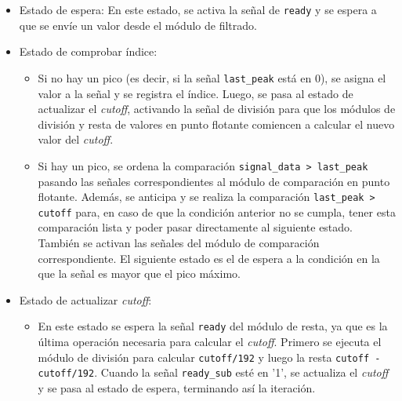 \begin{itemize}
    \item Estado de espera: En este estado, se activa la señal de \texttt{ready} y se espera a que se envíe un valor desde el módulo de filtrado.
    \item Estado de comprobar índice:
    \begin{itemize}
        \item Si no hay un pico (es decir, si la señal \texttt{last\_peak} está en 0), se asigna el valor a la señal y se registra el índice. Luego, se pasa al estado de actualizar el \textit{cutoff}, activando la señal de división para que los módulos de división y resta de valores en punto flotante comiencen a calcular el nuevo valor del \textit{cutoff}.
        \item Si hay un pico, se ordena la comparación \texttt{signal\_data > last\_peak} pasando las señales correspondientes al módulo de comparación en punto flotante. Además, se anticipa y se realiza la comparación \texttt{last\_peak > cutoff} para, en caso de que la condición anterior no se cumpla, tener esta comparación lista y poder pasar directamente al siguiente estado. También se activan las señales del módulo de comparación correspondiente. El siguiente estado es el de espera a la condición en la que la señal es mayor que el pico máximo.
    \end{itemize}
    
    \item Estado de actualizar \textit{cutoff}: 
    \begin{itemize}
        \item En este estado se espera la señal \texttt{ready} del módulo de resta, ya que es la última operación necesaria para calcular el \textit{cutoff}. Primero se ejecuta el módulo de división para calcular \texttt{cutoff/192} y luego la resta \texttt{cutoff - cutoff/192}. Cuando la señal \texttt{ready\_sub} esté en '1', se actualiza el \textit{cutoff} y se pasa al estado de espera, terminando así la iteración.
    \end{itemize}


\end{itemize}
